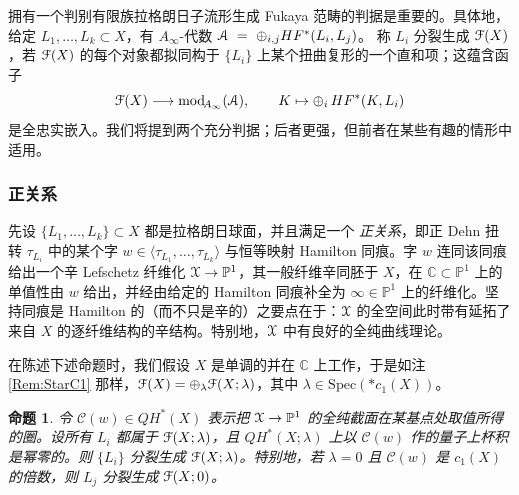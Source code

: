 \documentclass[11pt,a4paper]{article}
\numberwithin{equation}{section}
\newtheorem{Proposition}[thm]{命题}
\newcommand{\bC}{\mathbb{C}}
\newcommand{\bP}{\mathbb{P}}
\newcommand{\scrA}{\EuScript{A}}
\newcommand{\scrX}{\EuScript{X}}
\newcommand{\scrF}{\EuScript{F}}
\begin{document}
拥有一个判别有限族拉格朗日子流形生成 Fukaya 范畴的判据是重要的。具体地，给定 $L_1,\ldots,L_k \subset X$，有 $A_{\infty}$-代数
$\scrA \ = \ \oplus_{i,j} HF^*(L_i,L_j)$。
称 $L_i$ 分裂生成 $\scrF(X)$，若 $\scrF(X)$ 的每个对象都拟同构于 $\{L_i\}$ 上某个扭曲复形的一个直和项；这蕴含函子
\[
\scrF(X) \longrightarrow  \mathrm{mod}_{\!A_{\infty}}(\scrA), \qquad K \mapsto \oplus_i \, HF^*(K,L_i)
\]
是全忠实嵌入。我们将提到两个充分判据；后者更强，但前者在某些有趣的情形中适用。

\subsubsection{正关系}

先设 $\{L_1,\ldots, L_k\} \subset X$ 都是拉格朗日球面，并且满足一个 \emph{正关系}，即正 Dehn 扭转 $\tau_{L_i}$ 中的某个字 $w \in \langle \tau_{L_1}, \ldots, \tau_{L_k}\rangle$ 与恒等映射 Hamilton 同痕。字 $w$ 连同该同痕给出一个辛 Lefschetz 纤维化 $\scrX \rightarrow \bP^1$，其一般纤维辛同胚于 $X$，在 $\bC \subset \bP^1$ 上的单值性由 $w$ 给出，并经由给定的 Hamilton 同痕补全为 $\infty \in \bP^1$ 上的纤维化。坚持同痕是 Hamilton 的（而不只是辛的）之要点在于：$\scrX$ 的全空间此时带有延拓了来自 $X$ 的逐纤维结构的辛结构。特别地，$\scrX$ 中有良好的全纯曲线理论。

在陈述下述命题时，我们假设 $X$ 是单调的并在 $\bC$ 上工作，于是如注 \ref{Rem:StarC1} 那样，$\scrF(X) = \oplus_{\lambda} \scrF(X;\lambda)$，其中 $\lambda \in \mathrm{Spec}(\ast c_1(X))$。

\begin{Proposition} \label{Prop:SpheresGenerate}
令 $\mathcal{C}(w) \in QH^*(X)$ 表示把 $\scrX\rightarrow \bP^1$ 的全纯截面在某基点处取值所得的圈。设所有 $L_i$ 都属于 $\scrF(X; \lambda)$，且 $QH^*(X;\lambda) $ 上以 $\mathcal{C}(w)$ 作的量子上杯积是幂零的。则 $\{L_i\}$ 分裂生成 $\scrF(X;\lambda)$。特别地，若 $\lambda =0$ 且 $\mathcal{C}(w)$ 是 $c_1(X)$ 的倍数，则 $L_j$ 分裂生成 $\scrF(X;0)$。
\end{Proposition}
\end{document}
